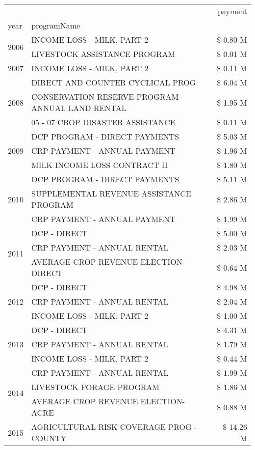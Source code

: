 \begin{tabular}{llr}
\toprule
 &  & payment \\
year & programName &  \\
\midrule
\multirow[t]{2}{*}{2006} & INCOME LOSS - MILK, PART 2 & \$ 0.80 M \\
 & LIVESTOCK ASSISTANCE PROGRAM & \$ 0.01 M \\
\cline{1-3}
2007 & INCOME LOSS - MILK, PART 2 & \$ 0.11 M \\
\cline{1-3}
\multirow[t]{3}{*}{2008} & DIRECT AND COUNTER CYCLICAL PROG & \$ 6.04 M \\
 & CONSERVATION RESERVE PROGRAM - ANNUAL LAND RENTAL & \$ 1.95 M \\
 & 05 - 07 CROP DISASTER ASSISTANCE & \$ 0.11 M \\
\cline{1-3}
\multirow[t]{3}{*}{2009} & DCP PROGRAM - DIRECT PAYMENTS & \$ 5.03 M \\
 & CRP PAYMENT - ANNUAL PAYMENT & \$ 1.96 M \\
 & MILK INCOME LOSS CONTRACT II & \$ 1.80 M \\
\cline{1-3}
\multirow[t]{3}{*}{2010} & DCP PROGRAM - DIRECT PAYMENTS & \$ 5.11 M \\
 & SUPPLEMENTAL REVENUE ASSISTANCE PROGRAM & \$ 2.86 M \\
 & CRP PAYMENT - ANNUAL PAYMENT & \$ 1.99 M \\
\cline{1-3}
\multirow[t]{3}{*}{2011} & DCP - DIRECT & \$ 5.00 M \\
 & CRP PAYMENT - ANNUAL RENTAL & \$ 2.03 M \\
 & AVERAGE CROP REVENUE ELECTION-DIRECT & \$ 0.64 M \\
\cline{1-3}
\multirow[t]{3}{*}{2012} & DCP - DIRECT & \$ 4.98 M \\
 & CRP PAYMENT - ANNUAL RENTAL & \$ 2.04 M \\
 & INCOME LOSS - MILK, PART 2 & \$ 1.00 M \\
\cline{1-3}
\multirow[t]{3}{*}{2013} & DCP - DIRECT & \$ 4.31 M \\
 & CRP PAYMENT - ANNUAL RENTAL & \$ 1.79 M \\
 & INCOME LOSS - MILK, PART 2 & \$ 0.44 M \\
\cline{1-3}
\multirow[t]{3}{*}{2014} & CRP PAYMENT - ANNUAL RENTAL & \$ 1.99 M \\
 & LIVESTOCK FORAGE PROGRAM & \$ 1.86 M \\
 & AVERAGE CROP REVENUE ELECTION-ACRE & \$ 0.88 M \\
\cline{1-3}
\multirow[t]{3}{*}{2015} & AGRICULTURAL RISK COVERAGE PROG - COUNTY & \$ 14.26 M \\

\end{tabular}
